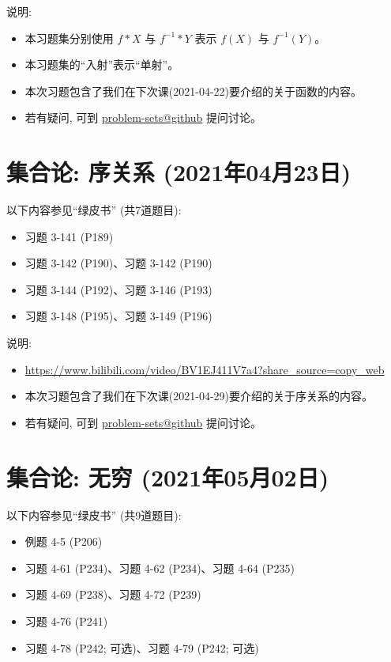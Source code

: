 \documentclass{article}
\begin{document}
说明:
\begin{itemize}
  \item 本习题集分别使用 $f \ast X$ 与 $f^{-1} \ast Y$ 表示 $f(X)$ 与 $f^{-1}(Y)$。
  \item 本习题集的``入射''表示``单射''。
  \item 本次习题包含了我们在下次课(2021-04-22)要介绍的关于函数的内容。
  \item 若有疑问, 可到 \href{https://github.com/courses-at-nju-by-hfwei/discrete-math-problem-sets/discussions}{problem-sets@github} 提问讨论。
\end{itemize}
\section{集合论: 序关系 (2021年04月23日)}

以下内容参见``绿皮书'' (共7道题目):
\begin{itemize}
  \item 习题 3-141 (P189)
  \item 习题 3-142 (P190)、习题 3-142 (P190)
  \item 习题 3-144 (P192)、习题 3-146 (P193)
  \item 习题 3-148 (P195)、习题 3-149 (P196)
\end{itemize}

说明:
\begin{itemize}
  \item \url{https://www.bilibili.com/video/BV1EJ411V7a4?share_source=copy_web}
  \item 本次习题包含了我们在下次课(2021-04-29)要介绍的关于序关系的内容。
  \item 若有疑问, 可到 \href{https://github.com/courses-at-nju-by-hfwei/discrete-math-problem-sets/discussions}{problem-sets@github} 提问讨论。
\end{itemize}
\section{集合论: 无穷 (2021年05月02日)}

以下内容参见``绿皮书'' (共9道题目):
\begin{itemize}
  \item 例题 4-5 (P206)
  \item 习题 4-61 (P234)、习题 4-62 (P234)、习题 4-64 (P235)
  \item 习题 4-69 (P238)、习题 4-72 (P239)
  \item 习题 4-76 (P241)
  \item 习题 4-78 (P242; 可选)、习题 4-79 (P242; 可选)
\end{itemize}
\end{document}
